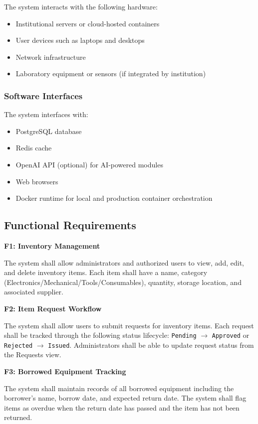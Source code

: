 \documentclass[12pt]{article}
\begin{document}
The system interacts with the following hardware:

\begin{itemize}
\item Institutional servers or cloud-hosted containers
\item User devices such as laptops and desktops
\item Network infrastructure
\item Laboratory equipment or sensors (if integrated by institution)
\end{itemize}

\subsubsection{Software Interfaces}

The system interfaces with:

\begin{itemize}
\item PostgreSQL database
\item Redis cache
\item OpenAI API (optional) for AI-powered modules
\item Web browsers
\item Docker runtime for local and production container orchestration
\end{itemize}

\subsection{Functional Requirements}

\textbf{F1: Inventory Management}

The system shall allow administrators and authorized users to view, add, edit, and delete inventory items. Each item shall have a name, category (Electronics/Mechanical/Tools/Consumables), quantity, storage location, and associated supplier.

\textbf{F2: Item Request Workflow}

The system shall allow users to submit requests for inventory items. Each request shall be tracked through the following status lifecycle: \texttt{Pending} $\rightarrow$ \texttt{Approved} or \texttt{Rejected} $\rightarrow$ \texttt{Issued}. Administrators shall be able to update request status from the Requests view.

\textbf{F3: Borrowed Equipment Tracking}

The system shall maintain records of all borrowed equipment including the borrower's name, borrow date, and expected return date. The system shall flag items as overdue when the return date has passed and the item has not been returned.
\end{document}
